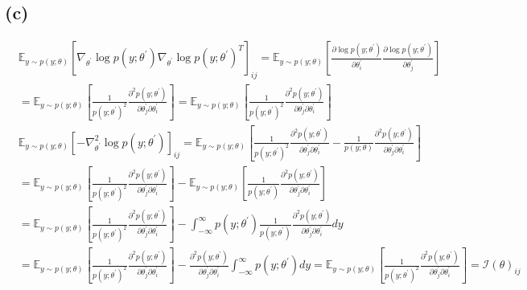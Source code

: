 \documentclass{article}
\begin{document}
\subsection*{(c)}
\begin{align*}
    & \mathbb{E}_{y\sim p(y;\theta)}[\nabla_{\theta^{'}}\log p(y;\theta^{'})\nabla_{\theta^{'}}\log p(y;\theta^{'})^{T}]_{ij}=\mathbb{E}_{y\sim p(y;\theta)}[\frac{\partial\log p(y;\theta^{'})}{\partial\theta_{i}^{'}}\frac{\partial\log p(y;\theta^{'})}{\partial\theta_{j}^{'}}]                                                                                                                                                                 \\
    & =\mathbb{E}_{y\sim p(y;\theta)}[\frac{1}{p(y;\theta^{'})^{2}}\frac{\partial^{2}p(y;\theta^{'})}{\partial\theta_{j}^{'}\partial\theta_{i}^{'}}]=\mathbb{E}_{y\sim p(y;\theta)}[\frac{1}{p(y;\theta^{'})^{2}}\frac{\partial^{2}p(y;\theta^{'})}{\partial\theta_{j}^{'}\partial\theta_{i}^{'}}]                                                                                                                                                   \\
    & \mathbb{E}_{y\sim p(y;\theta)}[-\nabla_{\theta^{'}}^{2}\log p(y;\theta^{'})]_{ij}=\mathbb{E}_{y\sim p(y;\theta)}[\frac{1}{p(y;\theta^{'})^{2}}\frac{\partial^{2}p(y;\theta^{'})}{\partial\theta_{j}^{'}\partial\theta_{i}^{'}}-\frac{1}{p(y;\theta)}\frac{\partial^{2}p(y;\theta^{'})}{\partial\theta_{j}^{'}\partial\theta_{i}^{'}}]                                                                                                          \\
    & =\mathbb{E}_{y\sim p(y;\theta)}[\frac{1}{p(y;\theta^{'})^{2}}\frac{\partial^{2}p(y;\theta^{'})}{\partial\theta_{j}^{'}\partial\theta_{i}^{'}}]-\mathbb{E}_{y\sim p(y;\theta)}[\frac{1}{p(y;\theta^{'})}\frac{\partial^{2}p(y;\theta^{'})}{\partial\theta_{j}^{'}\partial\theta_{i}^{'}}]                                                                                                                                                       \\
    & =\mathbb{E}_{y\sim p(y;\theta)}[\frac{1}{p(y;\theta^{'})^{2}}\frac{\partial^{2}p(y;\theta^{'})}{\partial\theta_{j}^{'}\partial\theta_{i}^{'}}]-\int_{-\infty}^{\infty}p(y;\theta^{'})\frac{1}{p(y;\theta^{'})}\frac{\partial^{2}p(y;\theta^{'})}{\partial\theta_{j}^{'}\partial\theta_{i}^{'}}dy                                                                                                                                               \\
    & =\mathbb{E}_{y\sim p(y;\theta)}[\frac{1}{p(y;\theta^{'})^{2}}\frac{\partial^{2}p(y;\theta^{'})}{\partial\theta_{j}^{'}\partial\theta_{i}^{'}}]-\frac{\partial^{2}p(y;\theta^{'})}{\partial\theta_{j}^{'}\partial\theta_{i}^{'}}\int_{-\infty}^{\infty}p(y;\theta^{'})dy=\mathbb{E}_{y\sim p(y;\theta)}[\frac{1}{p(y;\theta^{'})^{2}}\frac{\partial^{2}p(y;\theta^{'})}{\partial\theta_{j}^{'}\partial\theta_{i}^{'}}]=\mathcal{I}(\theta)_{ij}
\end{align*}
\end{document}
